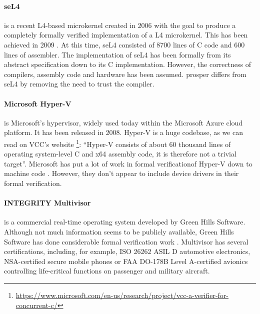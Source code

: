 \documentclass{kththesis}
\begin{document}
\paragraph{seL4} is a recent L4-based microkernel created in 2006 with the goal to produce a completely formally verified implementation of a L4 microkernel. This has been achieved in 2009 \cite{klein_sel4:_2009}. At this time, seL4 consisted of \num{8700} lines of C code and \num{600} lines of assembler. The implementation of seL4 has been formally from its abstract specification down to its C implementation. However, the correctness of compilers, assembly code and hardware has been assumed. \acrshort{prosper} differs from seL4 by removing the need to trust the compiler.

\paragraph{Microsoft Hyper-V} is Microsoft's hypervisor, widely used today within the Microsoft Azure cloud platform. It has been released in 2008. Hyper-V is a huge codebase, as we can read on VCC's website \footnote{\url{https://www.microsoft.com/en-us/research/project/vcc-a-verifier-for-concurrent-c/}}: ``Hyper-V consists of about 60 thousand lines of operating system-level C and x64 assembly code, it is therefore not a trivial target''. Microsoft has put a lot of work in formal verification\footnotemark of Hyper-V down to machine code \cite{leinenbach_verifying_2009}. However, they don't appear to include device drivers in their formal verification.


\paragraph{INTEGRITY Multivisor} is a commercial real-time operating system developed by Green Hills Software. Although not much information seems to be publicly available, Green Hills Software has done considerable formal verification work \cite{richards_modeling_2010}. Multivisor has several certifications, including, for example, ISO 26262 ASIL D automotive electronics, NSA-certified secure mobile phones or FAA DO-178B Level A-certified avionics controlling life-critical functions on passenger and military aircraft\footnotemark.

\end{document}
